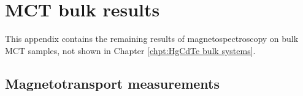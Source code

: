 \documentclass[titlepage,a4paper]{book}
\newcommand{\wciecie}{\quad\phantom{v}}
\newcommand{\myparagraph}[1]{\paragraph{#1}\mbox{}\\}
\begin{document}
\iffalse
\myparagraph{Sample C}
\begin{figure}[H]
	\centering
	\texttt{[image: gfx/wyniki/InAs/LL\_new.png]}
	\vspace{-10pt}
	\caption{\textit{Landau level graph of Sample C as a function of magnetic field at $T$ = 2 K. Vertical arrows with a corresponding Greek letter represent observed transitions between Landau levels in this system. Solid arrows ($\alpha$ and $\beta$) are interband transitions.}}
	\label{fig:LL_new}
\end{figure}

\begin{figure}[H]
	\centering
	\texttt{[image: gfx/wyniki/InAs/Points\_new.png]}
	\vspace{-10pt}
	\caption{\textit{Points corresponding to the minima of transmission for Sample C at $T$ = 2 K with curves showing the calculated transitions as a function of magnetic field.}}
	\label{fig:Points_new}
\end{figure}
\fi


\chapter{MCT bulk results}
\label{Appendix_bulk}
\wciecie
This appendix contains the remaining results of magnetospectroscopy on bulk MCT samples, not shown in Chapter \ref{chpt:HgCdTe bulk systems}.


\section{Magnetotransport measurements}
\end{document}
